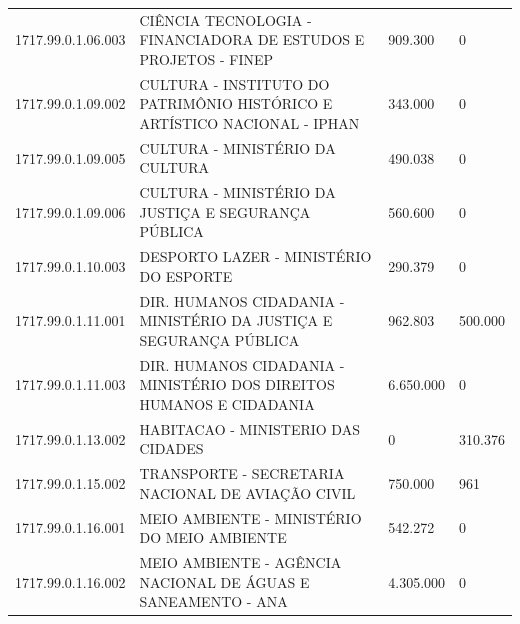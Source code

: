 \documentclass{article}
\begin{document}
\begin{longtable}[c]{m{2cm}|m{11cm}|m{2cm}m{2cm}}
\multicolumn{1}{C{2cm}|}{1717.99.0.1.06.003} & \multicolumn{1}{L{11cm}|}{CIÊNCIA TECNOLOGIA - FINANCIADORA DE ESTUDOS E PROJETOS - FINEP} & \multicolumn{1}{R{2cm}|}{909.300} & \multicolumn{1}{R{2cm}}{            0} \\
\multicolumn{1}{C{2cm}|}{1717.99.0.1.09.002} & \multicolumn{1}{L{11cm}|}{CULTURA - INSTITUTO DO PATRIMÔNIO HISTÓRICO E ARTÍSTICO NACIONAL - IPHAN} & \multicolumn{1}{R{2cm}|}{343.000} & \multicolumn{1}{R{2cm}}{            0} \\
\multicolumn{1}{C{2cm}|}{1717.99.0.1.09.005} & \multicolumn{1}{L{11cm}|}{CULTURA - MINISTÉRIO DA CULTURA} & \multicolumn{1}{R{2cm}|}{490.038} & \multicolumn{1}{R{2cm}}{            0} \\
\multicolumn{1}{C{2cm}|}{1717.99.0.1.09.006} & \multicolumn{1}{L{11cm}|}{CULTURA - MINISTÉRIO DA JUSTIÇA E SEGURANÇA PÚBLICA} & \multicolumn{1}{R{2cm}|}{560.600} & \multicolumn{1}{R{2cm}}{            0} \\
\multicolumn{1}{C{2cm}|}{1717.99.0.1.10.003} & \multicolumn{1}{L{11cm}|}{DESPORTO LAZER - MINISTÉRIO DO ESPORTE} & \multicolumn{1}{R{2cm}|}{290.379} & \multicolumn{1}{R{2cm}}{            0} \\
\multicolumn{1}{C{2cm}|}{1717.99.0.1.11.001} & \multicolumn{1}{L{11cm}|}{DIR. HUMANOS CIDADANIA - MINISTÉRIO DA JUSTIÇA E SEGURANÇA PÚBLICA} & \multicolumn{1}{R{2cm}|}{962.803} & \multicolumn{1}{R{2cm}}{500.000} \\
\multicolumn{1}{C{2cm}|}{1717.99.0.1.11.003} & \multicolumn{1}{L{11cm}|}{DIR. HUMANOS CIDADANIA - MINISTÉRIO DOS DIREITOS HUMANOS E CIDADANIA} & \multicolumn{1}{R{2cm}|}{6.650.000} & \multicolumn{1}{R{2cm}}{            0} \\
\multicolumn{1}{C{2cm}|}{1717.99.0.1.13.002} & \multicolumn{1}{L{11cm}|}{HABITACAO - MINISTERIO DAS CIDADES} & \multicolumn{1}{R{2cm}|}{            0} & \multicolumn{1}{R{2cm}}{310.376} \\
\multicolumn{1}{C{2cm}|}{1717.99.0.1.15.002} & \multicolumn{1}{L{11cm}|}{TRANSPORTE - SECRETARIA NACIONAL DE AVIAÇÃO CIVIL} & \multicolumn{1}{R{2cm}|}{750.000} & \multicolumn{1}{R{2cm}}{961} \\
\multicolumn{1}{C{2cm}|}{1717.99.0.1.16.001} & \multicolumn{1}{L{11cm}|}{MEIO AMBIENTE - MINISTÉRIO DO MEIO AMBIENTE} & \multicolumn{1}{R{2cm}|}{542.272} & \multicolumn{1}{R{2cm}}{            0} \\
\multicolumn{1}{C{2cm}|}{1717.99.0.1.16.002} & \multicolumn{1}{L{11cm}|}{MEIO AMBIENTE - AGÊNCIA NACIONAL DE ÁGUAS E SANEAMENTO - ANA} & \multicolumn{1}{R{2cm}|}{4.305.000} & \multicolumn{1}{R{2cm}}{            0} \\

\end{longtable}
\end{document}
